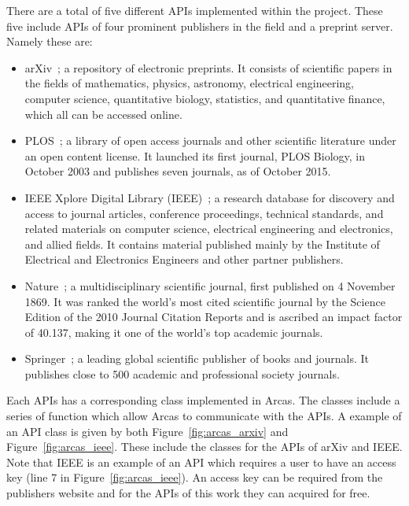 There are a total of five different APIs implemented within the project. These
five include APIs of four prominent publishers in the field and a preprint
server. Namely these are:

\begin{multicols}{2}
    \begin{itemize}
        \item arXiv~\cite{mckiernan2000}; a repository of electronic preprints.
        It consists of scientific
        papers in the fields of mathematics, physics, astronomy, electrical engineering,
        computer science, quantitative biology, statistics, and quantitative finance,
        which all can be accessed online.
        \item PLOS~\cite{plos}; a library of open access journals and other scientific literature
        under an open content license. It launched its first journal, PLOS Biology,
        in October 2003 and publishes seven journals, as of October 2015.
        \item IEEE Xplore Digital Library (IEEE)~\cite{ieee}; a research database for discovery
        and access to journal articles, conference proceedings, technical standards,
        and related materials on computer science, electrical engineering and electronics,
        and allied fields. It contains material published mainly by the Institute of
        Electrical and Electronics Engineers and other partner publishers. 
        \item Nature~\cite{nature}; a multidisciplinary scientific journal,
        first published on 4 November 1869. It was ranked the world's most cited
        scientific journal by the Science Edition of the 2010 Journal Citation Reports
        and is ascribed an impact factor of 40.137, making it one of the world's
        top academic journals.
        \item Springer~\cite{springer}; a leading global scientific publisher of
        books and journals. It publishes close to 500 academic and professional
        society journals.
    \end{itemize}
\end{multicols}

Each APIs has a corresponding class implemented in Arcas. The classes include
a series of function which allow Arcas to communicate with the APIs. A example
of an API class is given by both Figure~\ref{fig:arcas_arxiv} and Figure~\ref{fig:arcas_ieee}.
These include the classes for the APIs of arXiv and IEEE. Note that IEEE is
an example of an API which requires a user to have an access key
(line 7 in Figure~\ref{fig:arcas_ieee}). An access key can be required from the
publishers website and for the APIs of this work they can acquired for free.

